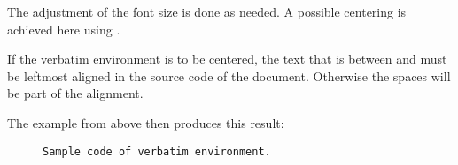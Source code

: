 The adjustment of the font size is done as needed. A possible centering  is
achieved here using .
\bigbreak

 If the verbatim environment is to be centered, the text that
is between  and
 must be leftmost aligned in the
source code of the document. Otherwise the spaces will be part of the
alignment.
\bigbreak

The example from above then produces this result:

\begin{figure}[H]
    \small
    \centering
    \begin{BVerbatim}
Sample code of verbatim environment.
    \end{BVerbatim}
\end{figure}
